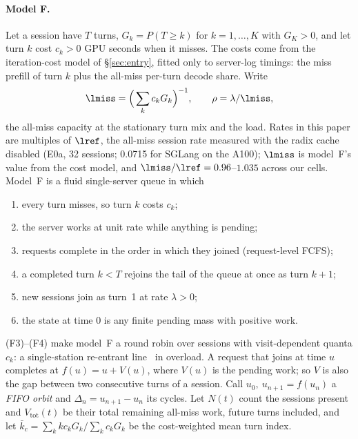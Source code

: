 \paragraph{Model F.} Let a session have $T$ turns, $G_k=P(T\ge k)$ for $k=1,\dots,K$ with $G_K>0$, and let turn $k$ cost $c_k>0$
GPU seconds when it misses. The costs come from the iteration-cost model of \S\ref{sec:entry}, fitted only to server-log
timings: the miss prefill of turn $k$ plus the all-miss per-turn decode share. Write
\[
\lmiss=\Big(\sum_kc_kG_k\Big)^{-1},\qquad \rho=\lambda/\lmiss ,
\]
the all-miss capacity at the stationary turn mix and the load. Rates in this paper are multiples of $\lref$, the all-miss
session rate measured with the radix cache disabled (E0a, 32 sessions; 0.0715\sps{} for SGLang on the A100); $\lmiss$ is model~F's
value from the cost model, and $\lmiss/\lref=0.96$--$1.035$ across our cells. Model~F is a fluid single-server queue in which
\begin{enumerate}[(F1),leftmargin=*,nosep]
\item every turn misses, so turn $k$ costs $c_k$;
\item the server works at unit rate while anything is pending;
\item requests complete in the order in which they joined (request-level FCFS);
\item a completed turn $k<T$ rejoins the tail of the queue at once as turn $k+1$;
\item new sessions join as turn~1 at rate $\lambda>0$;
\item the state at time 0 is any finite pending mass with positive work.
\end{enumerate}
(F3)--(F4) make model~F a round robin over sessions with visit-dependent quanta $c_k$: a single-station re-entrant
line~\citep{kumar1993reentrant} in overload. A request that joins at time $u$ completes at $f(u)=u+V(u)$, where $V(u)$ is the
pending work; so $V$ is also the gap between two consecutive turns of a session. Call $u_0,\ u_{n+1}=f(u_n)$ a \emph{FIFO orbit}
and $\Delta_n=u_{n+1}-u_n$ its cycles. Let $N(t)$ count the sessions present and $V_{\mathrm{tot}}(t)$ be their total remaining
all-miss work, future turns included, and let $\bar k_c=\sum_kkc_kG_k/\sum_kc_kG_k$ be the cost-weighted mean turn index.

